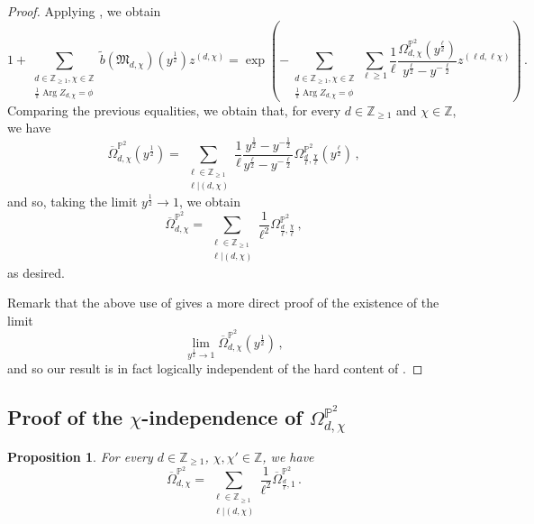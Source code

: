 \documentclass[11pt,letterpaper]{amsart}
\newtheorem{prop}[defn]{Proposition}
\newcommand\PP{\mathbb P}
\newcommand\Z{\mathbb Z}
\newcommand\fM{\mathfrak M}
\newcommand\Arg{\operatorname{Arg}}
\begin{document}
\begin{proof}
 
Applying \cite[Theorem 1.1]{meinhardt2015donaldson}, we obtain
\[ 1+\sum_{\substack{d \in \Z_{\geqslant 1},\chi \in \Z \\ \frac{1}{\pi} \Arg Z_{d,\chi}=\phi} } \tilde{b}(\fM_{d,\chi})(y^{\frac{1}{2}})
z^{(d,\chi)}=\exp 
\left( -\sum_{\substack{d \in \Z_{\geqslant 1},\chi \in \Z \\ 
\frac{1}{\pi} \Arg Z_{d,\chi}=\phi}} 
\sum_{\ell \geqslant 1}
\frac{1}{\ell}
\frac{\Omega^{\PP^2}_{d,\chi}(y^{\frac{\ell}{2}})}{y^{\frac{\ell}{2}}
-y^{-\frac{\ell}{2}}}
z^{(\ell d,\ell \chi)}
\right)
\,.\]
Comparing the previous equalities, we obtain that, for every $d\in \Z_{\geqslant 1}$ and $\chi \in \Z$, we have 
\[ \overline{\Omega}_{d,\chi}^{\PP^2}(y^{\frac{1}{2}})=
\sum_{\substack{\ell\in \Z_{\geqslant 1} \\\ell|(d,\chi)}}
\frac{1}{\ell} \frac{y^{\frac{1}{2}}-y^{-\frac{1}{2}}}{y^{\frac{\ell}{2}}-y^{-\frac{\ell}{2}}} \Omega_{\frac{d}{\ell},\frac{\chi}{\ell}}^{\PP^2}(y^{\frac{\ell}{2}})\,,\]
and so, taking the limit $y^{\frac{1}{2}}\rightarrow 1$, we obtain \[ \overline{\Omega}_{d,\chi}^{\PP^2}
=\sum_{\substack{\ell \in \Z_{\geqslant 1}
\\ \ell|(d,\chi)}}
\frac{1}{\ell^2}
\Omega_{\frac{d}{\ell},\frac{\chi}{\ell}}^{\PP^2} \,,\]
as desired.

Remark that the above use of \cite[Theorem 1.1]{meinhardt2015donaldson} gives a more direct proof of the existence of the limit 
\[\lim_{y^{\frac{1}{2}} \rightarrow 1} \overline{\Omega}^{\PP^2}_{d,\chi}
(y^{\frac{1}{2}})\,,\] 
and so our result is in fact logically independent of the hard 
content of \cite{MR2951762}.

\end{proof}

\subsection{Proof of the $\chi$-independence of $\Omega_{d,\chi}^{\PP^2}$}
\label{section_chi_independence}

\begin{prop}\label{prop_joyce_song_conjecture}
For every $d \in \Z_{\geqslant 1}$, $\chi, \chi' \in \Z$, we have 
\[ \overline{\Omega}^{\PP^2}_{d,\chi}
=\sum_{\substack{\ell\in \Z_{\geqslant 1}
\\\ell|(d,\chi)}} \frac{1}{\ell^2}
\overline{\Omega}^{\PP^2}_{\frac{d}{\ell},1}\,.\]
\end{prop}
\end{document}
